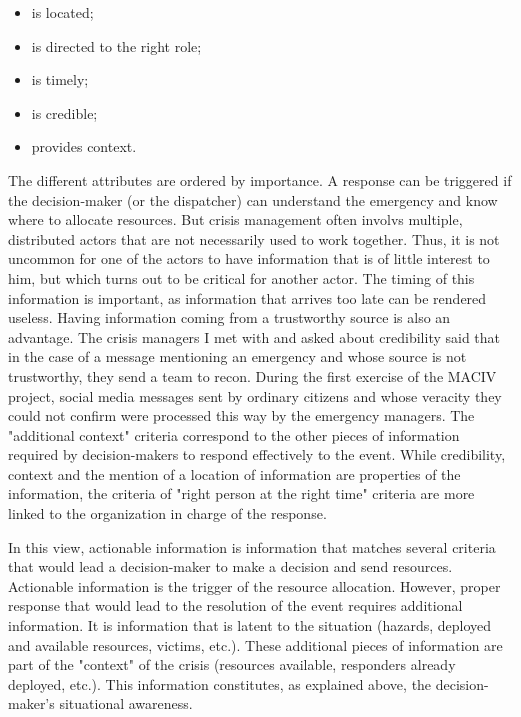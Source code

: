 \begin{itemize}
    \item is located;
    \item is directed to the right role;
    \item is timely;
    \item is credible;
    \item provides context.
\end{itemize}

The different attributes are ordered by importance.
A response can be triggered if the decision-maker (or the dispatcher) can understand the emergency
and know where to allocate resources.
But crisis management often involvs multiple, distributed actors that are not necessarily
used to work together.
Thus, it is not uncommon for one of the actors to have information that is of little interest to him,
but which turns out to be critical for another actor.
The timing of this information is important, as information that arrives too late can be rendered useless.
Having information coming from a trustworthy source is also an advantage.
The crisis managers I met with and asked about credibility said that in the case of a message
mentioning an emergency and whose source is not trustworthy, they send a team to recon.
During the first exercise of the MACIV project,  social media messages sent by ordinary
citizens and whose veracity they could not confirm were processed this way by the emergency managers.
The "additional context" criteria correspond to the other pieces of information required
by decision-makers to respond effectively to the event.
While credibility, context and the mention of a location of information are properties of the information, the criteria of "right person at the right time" criteria are more linked
to the organization in charge of the response.

In this view, actionable information is information that matches several criteria that would lead a decision-maker to make a decision and send resources.
Actionable information is the trigger of the resource allocation.
However, proper response that would lead to the resolution of the event requires additional information.
It is information that is latent to the situation (hazards, deployed and available resources, victims, etc.).
These additional pieces of information are part of the "context" of the crisis (resources available, responders already deployed, etc.).
This information constitutes, as explained above, the decision-maker's situational awareness.

